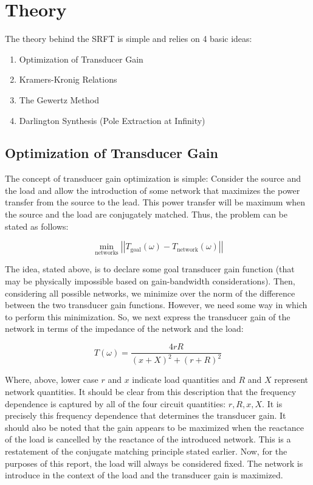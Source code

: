 \section*{Theory}

The theory behind the SRFT is simple and relies on 4 basic ideas:

\begin{enumerate}
    \item Optimization of Transducer Gain
    \item Kramers-Kronig Relations
    \item The Gewertz Method
    \item Darlington Synthesis (Pole Extraction at Infinity)
\end{enumerate}

\subsection*{Optimization of Transducer Gain}

The concept of transducer gain optimization is simple: Consider the source and
the load and allow the introduction of some network that maximizes the power
transfer from the source to the lead. This power transfer will be maximum when
the source and the load are conjugately matched. Thus, the problem can be stated
as follows:

\[
\min_{\text{networks}} \left| \left| T_{\text{goal}}(\omega) -
T_{\text{network}}(\omega) \right| \right|
\]

The idea, stated above, is to declare some goal transducer gain function (that may be
physically impossible based on gain-bandwidth considerations). Then, considering
all possible networks, we minimize over the norm of the difference between the
two transducer gain functions. However, we need some way in which to perform
this minimization. So, we next express the transducer gain of the network in
terms of the impedance of the network and the load:

\[ 
T(\omega) = \frac{4 r R}{(x + X)^2 + (r + R)^2} 
\]

Where, above, lower case $r$ and $x$ indicate load quantities and $R$ and $X$
represent network quantities. It should be clear from this description that the
frequency dependence is captured by all of the four circuit quantities: $r, R,
x, X$. It is precisely this frequency dependence that determines the transducer
gain. It should also be noted that the gain appears to be maximized when the
reactance of the load is cancelled by the reactance of the introduced network.
This is a restatement of the conjugate matching principle stated earlier. Now,
for the purposes of this report, the load will always be considered fixed. The
network is introduce in the context of the load and the transducer gain is
maximized.


